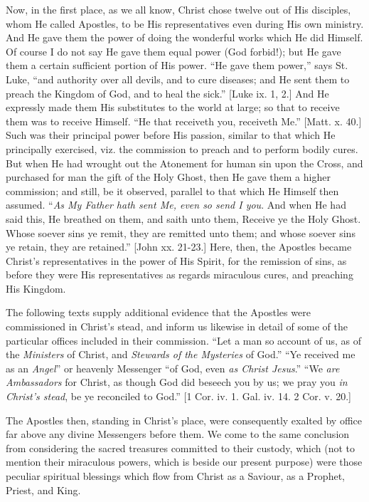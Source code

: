 Now, in the first place, as we all know, Christ chose twelve out of
His disciples, whom He called Apostles, to be His representatives even
during His own ministry. And He gave them the power of doing the
wonderful works which He did Himself. Of course I do not say He gave
them equal power (God forbid!); but He gave them a certain sufficient
portion of His power. ``He gave them power,'' says St. Luke,
``and authority over all devils, and to cure diseases; and He sent
them to preach the Kingdom of God, and to heal the sick.'' [Luke ix.
1, 2.] And He expressly made them His substitutes to the world at large;
so that to receive them was to receive Himself. ``He that receiveth
you, receiveth Me.'' [Matt. x. 40.] Such was their principal power
before His passion, similar to that which He principally exercised, viz.
the commission to preach and to perform bodily cures. But when He had
wrought out the Atonement for human sin upon the Cross, and purchased
for man the gift of the Holy Ghost, then He gave them a higher
commission; and still, be it observed, parallel to that which He Himself
then assumed. ``\emph{As My Father hath sent Me, even so send I you}.
And when He had said this, He breathed on them, and saith unto them,
Receive ye the Holy Ghost. Whose soever sins ye remit, they are remitted
unto them; and whose soever sins ye retain, they are retained.''
[John xx. 21-23.] Here, then, the Apostles became Christ's
representatives in the power of His Spirit, for the remission of sins,
as before they were His representatives as regards miraculous cures, and
preaching His Kingdom.

The following texts supply additional evidence that the Apostles were
commissioned in Christ's stead, and inform us likewise in detail of some
of the particular offices included in their commission. ``Let a man
so account of us, as of the \emph{Ministers} of Christ, and \emph{Stewards
of the Mysteries} of God.'' ``Ye received me as an \emph{Angel}''
or heavenly Messenger ``of God, even \emph{as Christ Jesus}.''
``We \emph{are Ambassadors} for Christ, as though God did beseech
you by us; we pray you \emph{in Christ's stead}, be ye reconciled to God.''
[1 Cor. iv. 1. Gal. iv. 14. 2 Cor. v. 20.]

The Apostles then, standing in Christ's place, were consequently
exalted by office far above any divine Messengers before them. We come
to the same conclusion from considering the sacred treasures committed
to their custody, which (not to mention their miraculous powers, which
is beside our present purpose) were those peculiar spiritual blessings
which flow from Christ as a Saviour, as a Prophet, Priest, and King.

